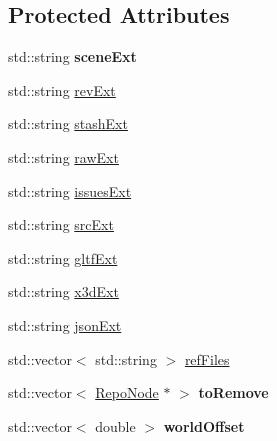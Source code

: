 \subsection*{Protected Attributes}
\begin{DoxyCompactItemize}
\item 
\hypertarget{classrepo_1_1core_1_1model_1_1_repo_scene_ac8fb04fbc037c6f0836b081d3b47bb26}{}std\+::string {\bfseries scene\+Ext}\label{classrepo_1_1core_1_1model_1_1_repo_scene_ac8fb04fbc037c6f0836b081d3b47bb26}

\item 
std\+::string \hyperlink{classrepo_1_1core_1_1model_1_1_repo_scene_ab33974cb8caec149fdd9743339f4d2ab}{rev\+Ext}
\item 
std\+::string \hyperlink{classrepo_1_1core_1_1model_1_1_repo_scene_a9e1ec4f9fa275647a75838361b3d2a5d}{stash\+Ext}
\item 
std\+::string \hyperlink{classrepo_1_1core_1_1model_1_1_repo_scene_a19be566f3815da34dea4447f4d5b2dba}{raw\+Ext}
\item 
std\+::string \hyperlink{classrepo_1_1core_1_1model_1_1_repo_scene_ade467377ddb29a8b7ea7347ed81ad0a4}{issues\+Ext}
\item 
std\+::string \hyperlink{classrepo_1_1core_1_1model_1_1_repo_scene_aaa568af1ee2cde77df38f4c3badb5981}{src\+Ext}
\item 
std\+::string \hyperlink{classrepo_1_1core_1_1model_1_1_repo_scene_a0de6d5d1c514db0e859b150feb312337}{gltf\+Ext}
\item 
std\+::string \hyperlink{classrepo_1_1core_1_1model_1_1_repo_scene_ac55e20f143934e73afbca758b8d3d626}{x3d\+Ext}
\item 
std\+::string \hyperlink{classrepo_1_1core_1_1model_1_1_repo_scene_a979903ee1680863f4c67cf524bbc6e9f}{json\+Ext}
\item 
std\+::vector$<$ std\+::string $>$ \hyperlink{classrepo_1_1core_1_1model_1_1_repo_scene_a72ff48bdd737480c5dd98edb4a39a557}{ref\+Files}
\item 
\hypertarget{classrepo_1_1core_1_1model_1_1_repo_scene_a7944b62e4b2398cc0dd6041fce738219}{}std\+::vector$<$ \hyperlink{classrepo_1_1core_1_1model_1_1_repo_node}{Repo\+Node} $\ast$ $>$ {\bfseries to\+Remove}\label{classrepo_1_1core_1_1model_1_1_repo_scene_a7944b62e4b2398cc0dd6041fce738219}

\item 
\hypertarget{classrepo_1_1core_1_1model_1_1_repo_scene_ac1d1bedbb3f3e9f54eedcb11f7ec86da}{}std\+::vector$<$ double $>$ {\bfseries world\+Offset}\label{classrepo_1_1core_1_1model_1_1_repo_scene_ac1d1bedbb3f3e9f54eedcb11f7ec86da}


\end{DoxyCompactItemize}
